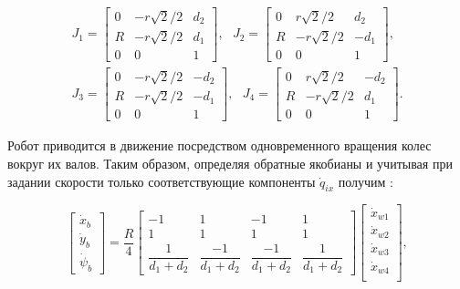 \documentclass[14pt, a4paper]{extreport}
\begin{document}
\[
\begin{gathered} 
J_1 =
\begin{bmatrix}
0 & -r\sqrt{2}/2 & d_2\\[1mm]
R & -r\sqrt{2}/2 & d_1\\[1mm]
0 & 0 & 1
\end{bmatrix}\!\!,\ \ \ 
J_2 =
\begin{bmatrix}
0 & r\sqrt{2}/2 & d_2\\[1mm]
R & -r\sqrt{2}/2 & -d_1\\[1mm]
0 & 0 & 1
\end{bmatrix}\!\!,\\
J_3 =
\begin{bmatrix}
0 & -r\sqrt{2}/2 & -d_2\\[1mm]
R & -r\sqrt{2}/2 & -d_1\\[1mm]
0 & 0 & 1
\end{bmatrix}\!\!,\ \ \ 
J_4 =
\begin{bmatrix}
0 & r\sqrt{2}/2 & -d_2\\[1mm]
R & -r\sqrt{2}/2 & d_1\\[1mm]
0 & 0 & 1
\end{bmatrix}\!\!.
		\tag{39} \label{eq:39}
\end{gathered}
\]

Робот приводится в движение посредством одновременного вращения колес вокруг их валов. Таким образом, определяя обратные якобианы и учитывая при задании скорости только соответствующие компоненты $\dot{q}_{ix}$ получим \cite{Hamid}:

\begin{equation}
\begin{bmatrix}
\dot{x}_b\\[1mm] \dot{y}_b\\[1mm] \dot{\psi}_b
\end{bmatrix} = 
\frac{R}{4}
\begin{bmatrix}
-1 & 1 & -1 & 1\\[1mm]
1 & 1 & 1 & 1\\[1mm]
\dfrac{1}{d_1+d_2} & \dfrac{-1}{d_1+d_2} & \dfrac{-1}{d_1+d_2} & \dfrac{1}{d_1+d_2}
\end{bmatrix}
\begin{bmatrix}
\dot{x}_{w1}\\[1mm] \dot{x}_{w2}\\[1mm] \dot{x}_{w3}\\[1mm] \dot{x}_{w4}\\[1mm]
\end{bmatrix}\!,
\tag{40} \label{eq:40}
\end{equation}
\end{document}
